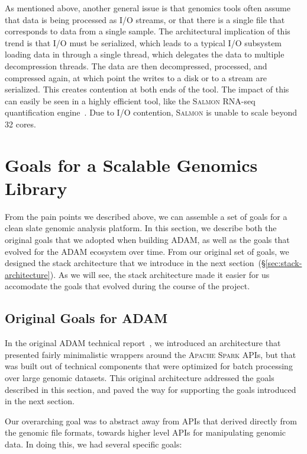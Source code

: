 \documentclass[phd]{ucbthesis}
\begin{document}
As mentioned above, another general issue is that genomics tools often assume
that data is being processed as I/O streams, or that there is a single file that
corresponds to data from a single sample. The architectural implication of this
trend is that I/O must be serialized, which leads to a typical I/O subsystem
loading data in through a single thread, which delegates the data to multiple
decompression threads. The data are then decompressed, processed, and compressed
again, at which point the writes to a disk or to a stream are serialized. This
creates contention at both ends of the tool. The impact of this can easily be
seen in a highly efficient tool, like the \textsc{Salmon} RNA-seq quantification
engine~\cite{patro17}. Due to I/O contention, \textsc{Salmon} is unable to scale
beyond 32 cores.

\section{Goals for a Scalable Genomics Library}
\label{sec:goals}

From the pain points we described above, we can assemble a set of goals for a
clean slate genomic analysis platform. In this section, we describe both the
original goals that we adopted when building \textsc{ADAM}, as well as the goals
that evolved for the \textsc{ADAM} ecosystem over time. From our original set
of goals, we designed the stack architecture that we introduce in the next
section~(\S\ref{sec:stack-architecture}). As we will see, the stack architecture
made it easier for us accomodate the goals that evolved during the course of
the project.

\subsection{Original Goals for \textsc{ADAM}}
\label{sec:original-goals}

In the original \textsc{ADAM} technical report~\cite{massie13}, we introduced an
architecture that presented fairly minimalistic wrappers around the
\textsc{Apache Spark} APIs, but that was built out of technical components that
were optimized for batch processing over large genomic datasets. This original
architecture addressed the goals described in this section, and paved the way
for supporting the goals introduced in the next section.

Our overarching goal was to abstract away from APIs that derived directly from
the genomic file formats, towards higher level APIs for manipulating genomic
data. In doing this, we had several specific goals:
\end{document}
